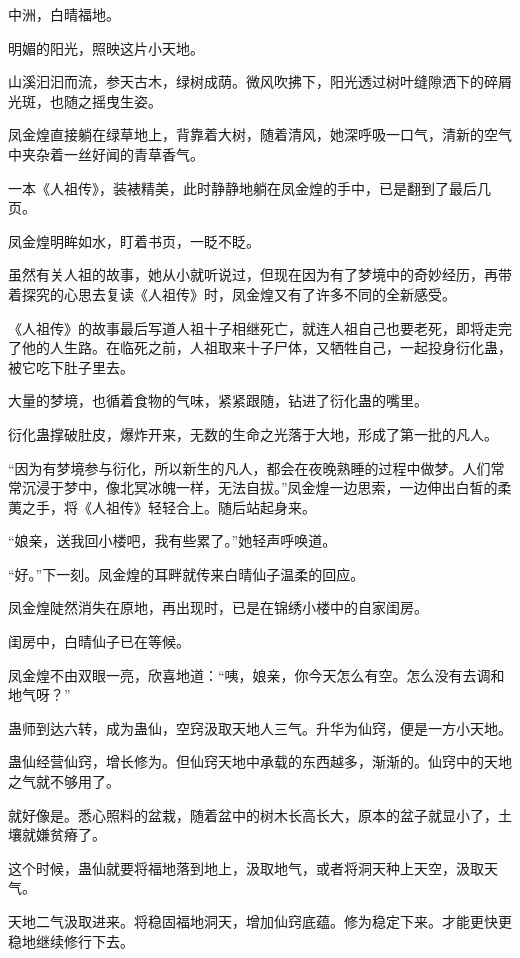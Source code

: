 
\begin{this_body}

中洲，白晴福地。

明媚的阳光，照映这片小天地。

山溪汩汩而流，参天古木，绿树成荫。微风吹拂下，阳光透过树叶缝隙洒下的碎屑光斑，也随之摇曳生姿。

凤金煌直接躺在绿草地上，背靠着大树，随着清风，她深呼吸一口气，清新的空气中夹杂着一丝好闻的青草香气。

一本《人祖传》，装裱精美，此时静静地躺在凤金煌的手中，已是翻到了最后几页。

凤金煌明眸如水，盯着书页，一眨不眨。

虽然有关人祖的故事，她从小就听说过，但现在因为有了梦境中的奇妙经历，再带着探究的心思去复读《人祖传》时，凤金煌又有了许多不同的全新感受。

《人祖传》的故事最后写道人祖十子相继死亡，就连人祖自己也要老死，即将走完了他的人生路。在临死之前，人祖取来十子尸体，又牺牲自己，一起投身衍化蛊，被它吃下肚子里去。

大量的梦境，也循着食物的气味，紧紧跟随，钻进了衍化蛊的嘴里。

衍化蛊撑破肚皮，爆炸开来，无数的生命之光落于大地，形成了第一批的凡人。

“因为有梦境参与衍化，所以新生的凡人，都会在夜晚熟睡的过程中做梦。人们常常沉浸于梦中，像北冥冰魄一样，无法自拔。”凤金煌一边思索，一边伸出白皙的柔荑之手，将《人祖传》轻轻合上。随后站起身来。

“娘亲，送我回小楼吧，我有些累了。”她轻声呼唤道。

“好。”下一刻。凤金煌的耳畔就传来白晴仙子温柔的回应。

凤金煌陡然消失在原地，再出现时，已是在锦绣小楼中的自家闺房。

闺房中，白晴仙子已在等候。

凤金煌不由双眼一亮，欣喜地道：“咦，娘亲，你今天怎么有空。怎么没有去调和地气呀？”

蛊师到达六转，成为蛊仙，空窍汲取天地人三气。升华为仙窍，便是一方小天地。

蛊仙经营仙窍，增长修为。但仙窍天地中承载的东西越多，渐渐的。仙窍中的天地之气就不够用了。

就好像是。悉心照料的盆栽，随着盆中的树木长高长大，原本的盆子就显小了，土壤就嫌贫瘠了。

这个时候，蛊仙就要将福地落到地上，汲取地气，或者将洞天种上天空，汲取天气。

天地二气汲取进来。将稳固福地洞天，增加仙窍底蕴。修为稳定下来。才能更快更稳地继续修行下去。


\end{this_body}
